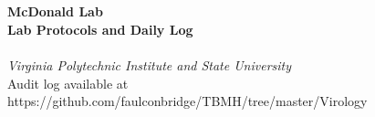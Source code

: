 
\begin{titlepage}
	{~ \\[5cm] }
	
	\noindent \HRule \\[0.4cm]
	{ \Huge \bfseries McDonald Lab \\[0.4cm] }
	{ \huge \bfseries Lab Protocols and Daily Log \\ }
	\HRule \\[0.4cm]
	
	{ \large \emph{Virginia Polytechnic Institute and State University} }\\[11cm]
	
	\noindent Audit log available at https://github.com/faulconbridge/TBMH/tree/master/Virology
\end{titlepage}